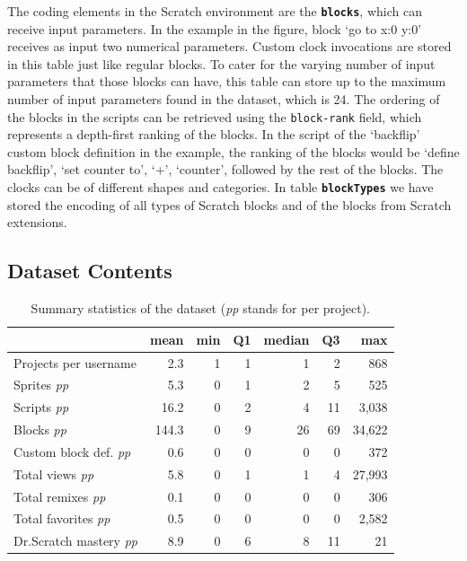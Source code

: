 \documentclass[10pt, conference]{IEEEtran}
\begin{document}
The coding elements in the Scratch environment are the \textbf{\texttt{blocks}}, which can receive input parameters.
In the example in the figure, block `go to x:0 y:0' receives as input two numerical parameters.
Custom clock invocations are stored in this table just like regular blocks.
To cater for the varying number of input parameters that those blocks can have, this table can store up to the maximum number of input parameters found in the dataset, which is 24.
The ordering of the blocks in the scripts can be retrieved using the \texttt{block-rank} field, which represents a depth-first ranking of the blocks.
In the script of the `backflip' custom block definition in the example, the ranking of the blocks would be `define backflip', `set counter to', `+', `counter', followed by the rest of the blocks.
The clocks can be of different shapes and categories.
In table \textbf{\texttt{blockTypes}} we have stored the encoding of all types of Scratch blocks and of the blocks from Scratch extensions.

\subsection{Dataset Contents}


\begin{table}[]
	\centering
	\begin{tabular}{lrrrrrr}
		&\textbf{mean}&\textbf{min}&\textbf{Q1}&\textbf{median}&\textbf{Q3}&\textbf{max}\\
		\hline
		Projects per username&2.3&1&1&1&2&868\\
		Sprites \emph{pp}&5.3&0&1&2&5&525\\
		Scripts \emph{pp}&16.2&0&2&4&11&3,038\\
		Blocks \emph{pp}&144.3&0&9&26&69&34,622\\
		Custom block def. \emph{pp}&0.6&0&0&0&0&372\\
		Total views \emph{pp}&5.8&0&1&1&4&27,993\\
		Total remixes \emph{pp}&0.1&0&0&0&0&306\\
		Total favorites \emph{pp}&0.5&0&0&0&0&2,582\\
		Dr.Scratch mastery \emph{pp}&8.9&0&6&8&11&21\\
		\hline
	\end{tabular}
	\caption{Summary statistics of the dataset (\emph{pp} stands for per project).}
	\label{tbl-stats}
\end{table}
\end{document}
